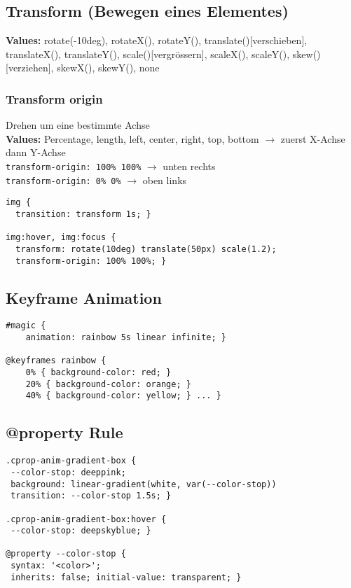 \subsection{Transform (Bewegen eines Elementes)}
\textbf{Values:} rotate(-10deg), rotateX(), rotateY(),  translate()[verschieben], translateX(), translateY(), scale()[vergrössern], scaleX(), scaleY(), skew()[verziehen], skewX(), skewY(), none
\subsubsection{Transform origin}
Drehen um eine bestimmte Achse\\
\textbf{Values:} Percentage, length, left, center, right, top, bottom $\rightarrow$ zuerst X-Achse dann Y-Achse \\
\texttt{transform-origin: 100\% 100\%} $\rightarrow$ unten rechts\\
\texttt{transform-origin: 0\% 0\%} $\rightarrow$ oben links

\begin{lstlisting}
img {
  transition: transform 1s; }

img:hover, img:focus {
  transform: rotate(10deg) translate(50px) scale(1.2);
  transform-origin: 100% 100%; }
\end{lstlisting}

\subsection{Keyframe Animation}
\begin{lstlisting}
#magic {
    animation: rainbow 5s linear infinite; }
    
@keyframes rainbow {
    0% { background-color: red; }
    20% { background-color: orange; }
    40% { background-color: yellow; } ... }
\end{lstlisting}

\subsection{@property Rule}
\begin{lstlisting}
.cprop-anim-gradient-box {
 --color-stop: deeppink; 
 background: linear-gradient(white, var(--color-stop))
 transition: --color-stop 1.5s; }

.cprop-anim-gradient-box:hover {
 --color-stop: deepskyblue; }

@property --color-stop { 
 syntax: '<color>';
 inherits: false; initial-value: transparent; }
\end{lstlisting}

